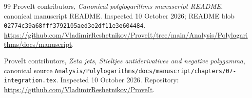 \documentclass[11pt,letterpaper]{article}
\numberwithin{equation}{section}
\theoremstyle{definition}
\theoremstyle{remark}
\newcommand{\file}[1]{\nolinkurl{#1}}
\begin{document}
\begin{thebibliography}{99}
ProveIt contributors, \emph{Canonical polylogarithms manuscript README},
canonical manuscript README. Inspected 10 October 2026;
README blob \texttt{02774c39a68fff3792105aed3e2df11e3e604484}.
\url{https://github.com/VladimirReshetnikov/ProveIt/tree/main/Analysis/Polylogarithms/docs/manuscript}.

ProveIt contributors, \emph{Zeta jets, Stieltjes antiderivatives and
negative polygamma}, canonical source
\file{Analysis/Polylogarithms/docs/manuscript/chapters/07-integration.tex}.
Inspected 10 October 2026. Repository:
\url{https://github.com/VladimirReshetnikov/ProveIt}.

\end{thebibliography}
\end{document}
